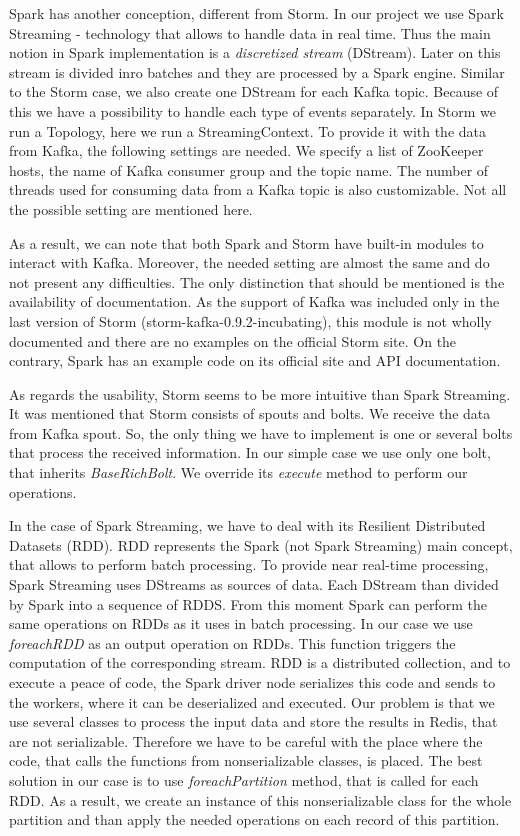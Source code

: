 Spark has another conception, different from Storm.
In our project we use Spark Streaming - technology that allows to handle data in real time.
Thus the main notion in Spark implementation is a \textit{discretized stream} (DStream).
Later on this stream is divided inro batches and they are processed by a Spark engine.
Similar to the Storm case, we also create one DStream for each Kafka topic.
Because of this we have a possibility to handle each type of events separately.
In Storm we run a Topology, here we run a StreamingContext.
To provide it with the data from Kafka, the following settings are needed.
We specify a list of ZooKeeper hosts, the name of Kafka consumer group and the topic name.
The number of threads used for consuming data from a Kafka topic is also customizable.
Not all the possible setting are mentioned here.

As a result, we can note that both Spark and Storm have built-in modules to interact with Kafka.
Moreover, the needed setting are almost the same and do not present any difficulties.
The only distinction that should be mentioned is the availability of documentation.
As the support of Kafka was included only in the last version of Storm (storm-kafka-0.9.2-incubating), this module is not wholly documented and there are no examples on the official Storm site.
On the contrary, Spark has an example code on its official site and API documentation. 

As regards the usability, Storm seems to be more intuitive than Spark Streaming.
It was mentioned that Storm consists of spouts and bolts.
We receive the data from Kafka spout.
So, the only thing we have to implement is one or several bolts that process the received information.
In our simple case we use only one bolt, that inherits \textit{BaseRichBolt}.
We override its \textit{execute} method to perform our operations.

In the case of Spark Streaming, we have to deal with its Resilient Distributed Datasets (RDD).
RDD represents the Spark (not Spark Streaming) main concept, that allows to perform batch processing.
To provide near real-time processing, Spark Streaming uses DStreams as sources of data.
Each DStream than divided by Spark into a sequence of RDDS.
From this moment Spark can perform the same operations on RDDs as it uses in batch processing.
In our case we use \textit{foreachRDD} as an output operation on RDDs.
This function triggers the computation of the corresponding stream.
RDD is a distributed collection, and to execute a peace of code, the Spark driver node serializes this code and sends to the workers, where it can be deserialized and executed.
Our problem is that we use several classes to process the input data and store the results in Redis, that are not serializable.
Therefore we have to be careful with the place where the code, that calls the functions from nonserializable classes, is placed.
The best solution in our case is to use \textit{foreachPartition} method, that is called for each RDD.
As a result, we create an instance of this nonserializable class for the whole partition and than apply the needed operations on each record of this partition. 
 
